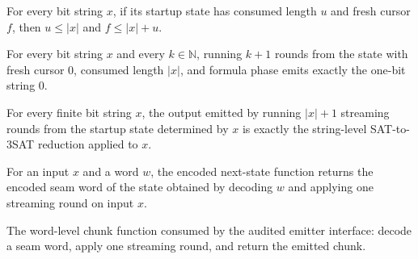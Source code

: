 \begin{lemma}
\label{Complexity.satStreamStart_bound}
\leanok
{}
For every bit string $x$, if its startup state has consumed length $u$ and fresh cursor
$f$, then $u\le |x|$ and $f\le |x|+u$.
\end{lemma}

\begin{lemma}
\label{Complexity.satStreamRun_fallback}
\leanok
{}
For every bit string $x$ and every $k\in\mathbb{N}$, running $k+1$ rounds from the state
with fresh cursor $0$, consumed length $|x|$, and formula phase emits exactly the
one-bit string $0$.
\end{lemma}

\begin{lemma}
\label{Complexity.satStreamRun_correct}
\leanok
{}
For every finite bit string $x$, the output emitted by running $|x|+1$ streaming rounds
from the startup state determined by $x$ is exactly the string-level SAT-to-3SAT
reduction applied to $x$.
\end{lemma}

\begin{definition}
\label{Complexity.satStreamStep}
\leanok
{}
For an input $x$ and a word $w$, the encoded next-state function returns the
encoded seam word of the state obtained by decoding $w$ and applying one streaming
round on input $x$.
\end{definition}

\begin{definition}
\label{Complexity.satStreamEmit}
\leanok
{}
The word-level chunk function consumed by the audited emitter interface: decode a
seam word, apply one streaming round, and return the emitted chunk.
\end{definition}

